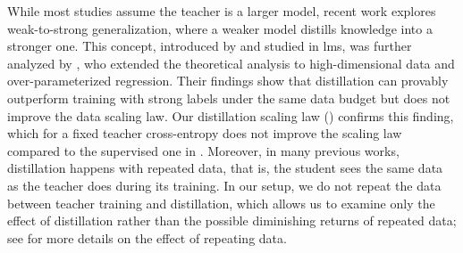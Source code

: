 While most studies assume the teacher is a larger model, recent work explores weak-to-strong generalization, where a weaker model distills knowledge into a stronger one. This concept, introduced by \citet{DBLP:conf/icml/BurnsIKBGACEJLS24} and studied in \glspl{lm}, was further analyzed by \citet{DBLP:journals/corr/abs-2410-18837}, who extended the theoretical analysis to high-dimensional data and over-parameterized regression. Their findings show that distillation can provably outperform training with strong labels under the same data budget but does not improve the data scaling law. 
Our distillation scaling law () confirms this finding, which for a fixed teacher cross-entropy does not improve the scaling law compared to the supervised one in . Moreover, in many previous works,  distillation happens with repeated data, that is, the student sees the same data as the teacher does during its training. 
In our setup, we do not repeat the data between teacher training and distillation, which allows us to examine only the effect of distillation rather than the possible diminishing returns of repeated data; see \citet{DBLP:journals/corr/abs-2305-16264} for more details on the effect of repeating data.



